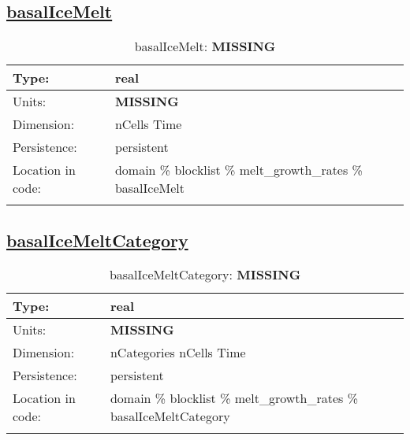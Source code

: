 \subsection[basalIceMelt]{\hyperref[sec:var_tab_melt_growth_rates]{basalIceMelt}}
\label{subsec:var_sec_melt_growth_rates_basalIceMelt}
\begin{center}
\begin{longtable}{| p{2.0in} | p{4.0in} |}
        \hline 
        Type: & real \\
        \hline 
        Units: & {\bf \color{red} MISSING} \\
        \hline 
        Dimension: & nCells Time \\
        \hline 
        Persistence: & persistent \\
        \hline 
         Location in code: & domain \% blocklist \% melt\_growth\_rates \% basalIceMelt \\
         \hline 
    \caption{basalIceMelt: {\bf \color{red} MISSING}}
\end{longtable}
\end{center}
\subsection[basalIceMeltCategory]{\hyperref[sec:var_tab_melt_growth_rates]{basalIceMeltCategory}}
\label{subsec:var_sec_melt_growth_rates_basalIceMeltCategory}
\begin{center}
\begin{longtable}{| p{2.0in} | p{4.0in} |}
        \hline 
        Type: & real \\
        \hline 
        Units: & {\bf \color{red} MISSING} \\
        \hline 
        Dimension: & nCategories nCells Time \\
        \hline 
        Persistence: & persistent \\
        \hline 
         Location in code: & domain \% blocklist \% melt\_growth\_rates \% basalIceMeltCategory \\
         \hline 
    \caption{basalIceMeltCategory: {\bf \color{red} MISSING}}
\end{longtable}
\end{center}
